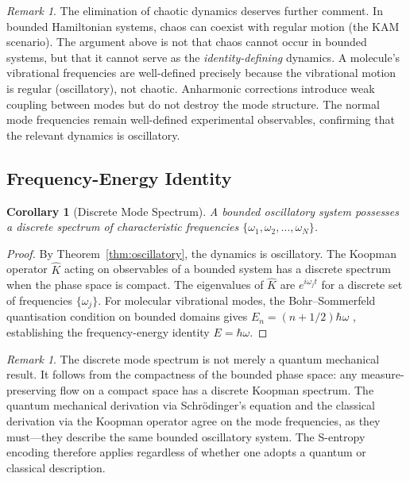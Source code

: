 \documentclass[11pt,twocolumn,a4paper]{article}
\newtheorem{corollary}[theorem]{Corollary}
\theoremstyle{definition}
\theoremstyle{remark}
\newtheorem{remark}[theorem]{Remark}
\begin{document}
\begin{remark}
The elimination of chaotic dynamics deserves further comment. In bounded Hamiltonian systems, chaos can coexist with regular motion (the KAM scenario). The argument above is not that chaos cannot occur in bounded systems, but that it cannot serve as the \emph{identity-defining} dynamics. A molecule's vibrational frequencies are well-defined precisely because the vibrational motion is regular (oscillatory), not chaotic. Anharmonic corrections introduce weak coupling between modes but do not destroy the mode structure. The normal mode frequencies remain well-defined experimental observables, confirming that the relevant dynamics is oscillatory.
\end{remark}

\subsection{Frequency-Energy Identity}

\begin{corollary}[Discrete Mode Spectrum]
\label{cor:discrete}
A bounded oscillatory system possesses a discrete spectrum of characteristic frequencies $\{\omega_1, \omega_2, \ldots, \omega_N\}$.
\end{corollary}

\begin{proof}
By Theorem~\ref{thm:oscillatory}, the dynamics is oscillatory. The Koopman operator $\hat{K}$ \citep{koopman1931} acting on observables of a bounded system has a discrete spectrum when the phase space is compact. The eigenvalues of $\hat{K}$ are $e^{i\omega_j t}$ for a discrete set of frequencies $\{\omega_j\}$. For molecular vibrational modes, the Bohr--Sommerfeld quantisation condition on bounded domains gives $E_n = (n + 1/2)\hbar\omega$ \citep{bohr1913}, establishing the frequency-energy identity $E = \hbar\omega$.
\end{proof}

\begin{remark}
The discrete mode spectrum is not merely a quantum mechanical result. It follows from the compactness of the bounded phase space: any measure-preserving flow on a compact space has a discrete Koopman spectrum. The quantum mechanical derivation via Schr\"odinger's equation and the classical derivation via the Koopman operator agree on the mode frequencies, as they must---they describe the same bounded oscillatory system. The S-entropy encoding therefore applies regardless of whether one adopts a quantum or classical description.
\end{remark}
\end{document}

